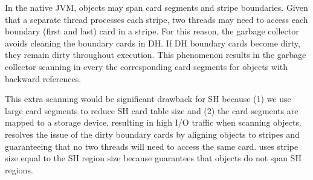 In the native JVM, objects may span card segments and stripe
boundaries. Given that a separate \teraheapGC thread processes each stripe,
two threads may need to access each boundary (first and last) card in
a stripe. For this reason, the garbage collector avoids cleaning the
boundary cards in DH. If DH boundary cards become dirty, they remain
dirty throughout execution. This phenomenon results in the garbage
collector scanning in every \teraheapGC the corresponding card segments for
objects with backward references.

This extra scanning would be significant drawback for SH because (1) we use
large card segments to reduce SH card table size and (2) the card segments are
mapped to a storage device, resulting in high I/O traffic when scanning objects.
\teraheapName{} resolves the issue of the dirty boundary cards by aligning objects to
stripes and guaranteeing that no two threads will need to access the same card.
\teraheapName{} uses stripe size equal to the SH region size because \teraheapName{} guarantees
that objects do not span SH regions.

